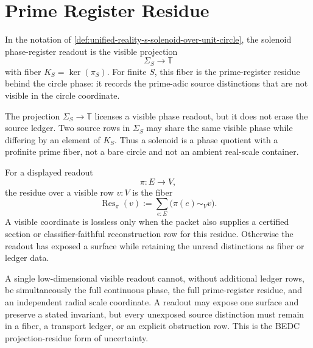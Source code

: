 \section{Prime Register Residue}
\label{sec:rh-prime-register-residue}

\begin{definition}
\label{def:rh-solenoid-phase-register}
In the notation of
\autoref{def:unified-reality-s-solenoid-over-unit-circle}, the solenoid
phase-register readout is the visible projection
$$
\Sigma_S
\to
\mathbb T
$$
with fiber $K_S=\ker(\pi_S)$. For finite $S$, this fiber is the
prime-register residue behind the circle phase: it records the
prime-adic source distinctions that are not visible in the circle
coordinate.
\end{definition}

\begin{principle}
\label{prin:rh-prime-registers-not-phase-coordinates}
The projection $\Sigma_S\to\mathbb T$ licenses a visible phase readout,
but it does not erase the source ledger. Two source rows in $\Sigma_S$ may
share the same visible phase while differing by an element of
$K_S$. Thus a solenoid is a phase quotient with a profinite prime fiber,
not a bare circle and not an ambient real-scale container.
\end{principle}

\begin{definition}
\label{def:rh-projection-residue}
For a displayed readout
$$
\pi:E\to V,
$$
the residue over a visible row $v:V$ is the fiber
$$
\operatorname{Res}_{\pi}(v)
:=
\sum_{e:E}\bigl(\pi(e)\sim_V v\bigr).
$$
A visible coordinate is lossless only when the packet also supplies a
certified section or classifier-faithful reconstruction row for this
residue. Otherwise the readout has exposed a surface while retaining the
unread distinctions as fiber or ledger data.
\end{definition}

\begin{principle}
\label{prin:rh-projection-residue-uncertainty}
A single low-dimensional visible readout cannot, without additional
ledger rows, be simultaneously the full continuous phase, the full
prime-register residue, and an independent radial scale coordinate. A
readout may expose one surface and preserve a stated invariant, but every
unexposed source distinction must remain in a fiber, a transport ledger,
or an explicit obstruction row. This is the BEDC projection-residue form
of uncertainty.
\end{principle}

